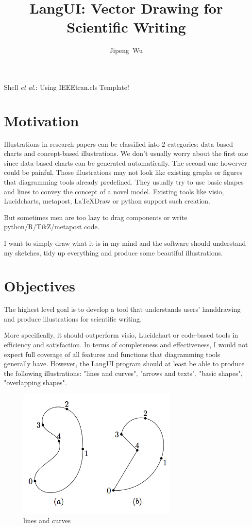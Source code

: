 \documentclass[10pt,conference, twocolumn]{IEEEtran}
\begin{document}
\title{LangUI: Vector Drawing for Scientific Writing}
\author{Jipeng~Wu}
%
{Shell \MakeLowercase{\textit{et al.}}: Using IEEEtran.cls Template!}
\maketitle


\section{Motivation}
Illustrations in research papers can be classified into 2 categories: data-based charts and concept-based illustrations. We don't usually worry about the first one since data-based charts can be generated automatically. The second one howerver could be painful. Those illustrations may not look like existing graphs or figures that diagramming tools already predefined. They usually try to use basic shapes and lines to convey the concept of a novel model. Existing tools like visio, Lucidcharts, metapost, LaTeXDraw or python support such creation.

But sometimes men are too lazy to drag components or write python/R/TikZ/metapost code.

I want to simply draw what it is in my mind and the software should understand my sketches, tidy up everything and produce some beautiful illustrations.

\section{Objectives}
The highest level goal is to develop a tool that understands users' handdrawing and produce illustrations for scientific writing.

More specifically, it should outperform visio, Lucidchart or code-based tools in efficiency and satisfaction. In terms of completeness and effectiveness, I would not expect full coverage of all features and functions that diagramming tools generally have. However, the LangUI program should at least be able to produce the following illustrations: "lines and curves", "arrows and texts", "basic shapes", "overlapping shapes".

\begin{figure}[H]
\caption{lines and curves}
\includegraphics[width=8cm]{1.png}
\end{figure}
\end{document}
